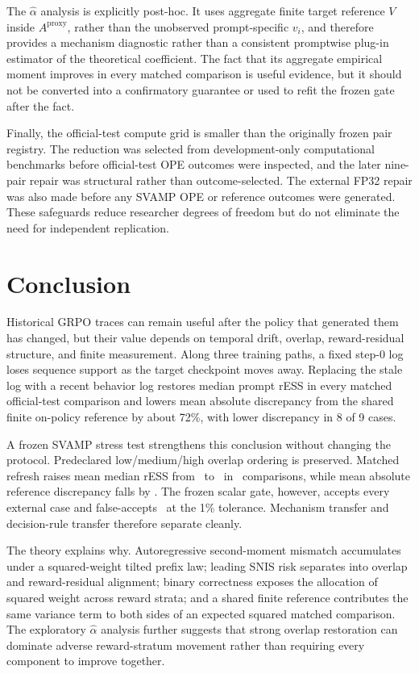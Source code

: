 \documentclass[10pt]{article}
\theoremstyle{remark}
\begin{document}
The $\widehat\alpha$ analysis is explicitly post-hoc. It uses aggregate finite target reference $V$ inside $A^{\mathrm{proxy}}$, rather than the unobserved prompt-specific $v_i$, and therefore provides a mechanism diagnostic rather than a consistent promptwise plug-in estimator of the theoretical coefficient. The fact that its aggregate empirical moment improves in every matched comparison is useful evidence, but it should not be converted into a confirmatory guarantee or used to refit the frozen gate after the fact.

Finally, the official-test compute grid is smaller than the originally frozen pair registry. The reduction was selected from development-only computational benchmarks before official-test OPE outcomes were inspected, and the later nine-pair repair was structural rather than outcome-selected. The external FP32 repair was also made before any SVAMP OPE or reference outcomes were generated. These safeguards reduce researcher degrees of freedom but do not eliminate the need for independent replication.

\section{Conclusion}
Historical GRPO traces can remain useful after the policy that generated them has changed, but their value depends on temporal drift, overlap, reward-residual structure, and finite measurement. Along three training paths, a fixed step-0 log loses sequence support as the target checkpoint moves away. Replacing the stale log with a recent behavior log restores median prompt rESS in every matched official-test comparison and lowers mean absolute discrepancy from the shared finite on-policy reference by about 72\%, with lower discrepancy in 8 of 9 cases.

A frozen SVAMP stress test strengthens this conclusion without changing the protocol. Predeclared low/medium/high overlap ordering is preserved. Matched refresh raises mean median rESS from \SvOldRess\ to \SvRecentRess\ in \SvMatchedRessCount\ comparisons, while mean absolute reference discrepancy falls by \SvMAEReduction. The frozen scalar gate, however, accepts every external case and false-accepts \SvGateFAOne\ at the 1\% tolerance. Mechanism transfer and decision-rule transfer therefore separate cleanly.

The theory explains why. Autoregressive second-moment mismatch accumulates under a squared-weight tilted prefix law; leading SNIS risk separates into overlap and reward-residual alignment; binary correctness exposes the allocation of squared weight across reward strata; and a shared finite reference contributes the same variance term to both sides of an expected squared matched comparison. The exploratory $\widehat\alpha$ analysis further suggests that strong overlap restoration can dominate adverse reward-stratum movement rather than requiring every component to improve together.
\end{document}
